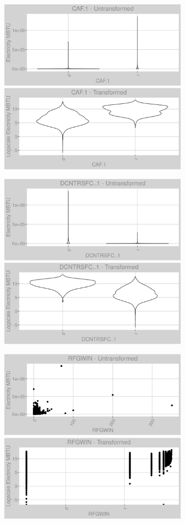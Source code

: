 \newpage
\begin{figure}
\centering
\begin{subfigure}{1\textwidth}
\centering
\includegraphics[width=.49\textwidth, height=0.3\textheight]{Images/electricity_var_original_9.png}
\includegraphics[width=.49\textwidth, height=0.3\textheight]{Images/electricity_var_transformed_9.png}
\end{subfigure}
\begin{subfigure}{1\textwidth}
\centering
\includegraphics[width=.49\textwidth, height=0.3\textheight]{Images/electricity_var_original_10.png}
\includegraphics[width=.49\textwidth, height=0.3\textheight]{Images/electricity_var_transformed_10.png}
\end{subfigure}
\begin{subfigure}{1\textwidth}
\centering
\includegraphics[width=.49\textwidth, height=0.3\textheight]{Images/electricity_var_original_11.png}
\includegraphics[width=.49\textwidth, height=0.3\textheight]{Images/electricity_var_transformed_11.png}
\end{subfigure}
\end{figure}
